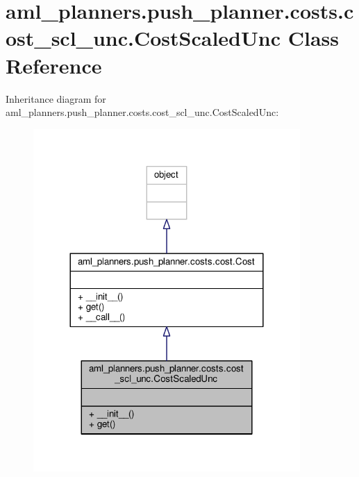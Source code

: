 \hypertarget{classaml__planners_1_1push__planner_1_1costs_1_1cost__scl__unc_1_1_cost_scaled_unc}{\section{aml\-\_\-planners.\-push\-\_\-planner.\-costs.\-cost\-\_\-scl\-\_\-unc.\-Cost\-Scaled\-Unc Class Reference}
\label{classaml__planners_1_1push__planner_1_1costs_1_1cost__scl__unc_1_1_cost_scaled_unc}
}


Inheritance diagram for aml\-\_\-planners.\-push\-\_\-planner.\-costs.\-cost\-\_\-scl\-\_\-unc.\-Cost\-Scaled\-Unc\-:\nopagebreak
\begin{figure}[H]
\begin{center}
\leavevmode
\includegraphics[width=288pt]{classaml__planners_1_1push__planner_1_1costs_1_1cost__scl__unc_1_1_cost_scaled_unc__inherit__graph}
\end{center}
\end{figure}


